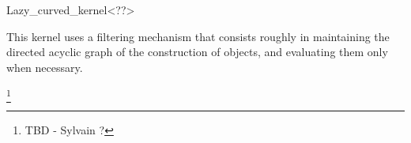 \begin{ccRefClass}{Lazy_curved_kernel<??>}

\ccDefinition

This kernel uses a filtering mechanism that consists roughly in
maintaining the directed acyclic graph of the construction of objects,
and evaluating them only when necessary.


\ccIsModel


\ccParameters

\footnote{TBD - Sylvain ?}


\end{ccRefClass}

